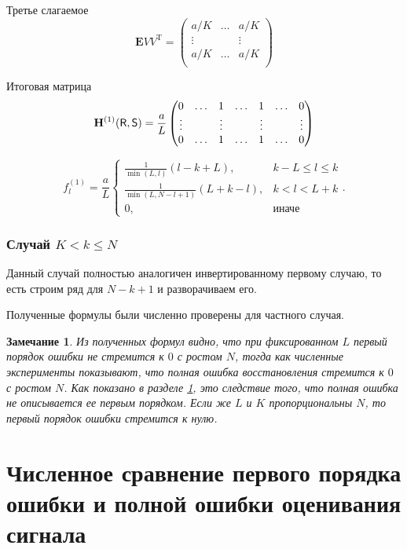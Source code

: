 \documentclass[specialist,
               substylefile = spbu.rtx,
               subf,href,colorlinks=true, 12pt]{disser}
\newtheorem{remark}{Замечание}
\begin{document}
Третье слагаемое
$$\mathbf{E} V V^{\mathrm{T}} = \begin{pmatrix}
	a/K &  \ldots & a/K\\
	\vdots & & \vdots\\
	a/K &  \ldots & a/K\\
\end{pmatrix}$$

Итоговая матрица
$$\mathbf{H}^{(1)}(\textsf{R}, \textsf{S}) = \frac{a}{L}\begin{pmatrix}
	0 & \ldots & 1 & \ldots & 1 & \ldots & 0\\
	\vdots & & \vdots & & \vdots & & \vdots\\
	0 & \ldots & 1 & \ldots & 1 & \ldots & 0
\end{pmatrix}$$

$$f^{(1)}_l = \frac{a}{{L}}
\begin{cases}
	\frac{1}{\min(L, l)}(l - k + L), & \text{$k - L \leq l \leq k$}\\
	\frac{1}{\min(L, N - l + 1)}(L + k - l), & \text{$k < l < L + k$}\\
	0, & \text{иначе}
\end{cases}.$$


\subsubsection{Случай $K < k \leq N$}
Данный случай полностью аналогичен инвертированному первому случаю, то есть строим ряд для $N - k + 1$ и разворачиваем его.

\vspace{1em}
Полученные формулы были численно проверены для частного случая.

\begin{remark}
	Из полученных формул видно, что при фиксированном $L$ первый порядок ошибки не стремится к $0$ с ростом $N$, тогда как численные эксперименты показывают, что полная ошибка восстановления стремится к $0$ с ростом $N$. Как показано в разделе \ref{sec:results}, это следствие того, что полная ошибка не описывается ее первым порядком. Если же $L$ и $K$ пропорциональны $N$, то первый порядок ошибки стремится к нулю.
\end{remark}


\section{Численное сравнение первого порядка ошибки и полной ошибки оценивания сигнала}
\label{sec:results}
\end{document}
